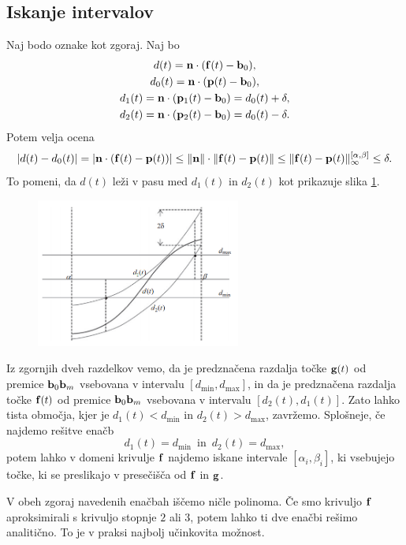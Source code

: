 

\subsection{Iskanje intervalov}
 Naj bodo oznake kot zgoraj. Naj bo
\begin{gather*}
d(t) = {\bf n}\cdot({\bf f}(t) - {\bf b}_0),\\
d_0(t)= {\bf n}\cdot ({\bf p}(t) - {\bf b}_0),\\
d_1(t) = {\bf n}\cdot ({\bf p}_1(t) - {\bf b}_0) = d_0(t) + \delta, \\
d_2(t) = {\bf n}\cdot ({\bf p}_2(t) - {\bf b}_0) = d_0(t) - \delta.
\end{gather*}
Potem velja ocena
$$
|d(t)-d_0(t)|=|{\bf n}\cdot({\bf f}(t)-{\bf p}(t))|\leq \lVert {\bf n}\rVert\cdot \lVert {\bf f}(t) - {\bf p}(t) \rVert \leq \lVert {\bf f}(t) - {\bf p}(t) \rVert _{\infty}^{[\alpha,\beta]} \leq \delta.
$$
To pomeni, da $d(t)$ leži v pasu med $d_1(t)$ in $d_2(t)$ kot prikazuje slika \ref{slika4}.
\begin{figure}[!h]
    \centering 
    \includegraphics[width=0.6\textwidth]{dist}
    \caption{}
  	\label{slika4}
\end{figure}

Iz zgornjih dveh razdelkov vemo, da je predznačena razdalja točke ${\bf g}(t)$ od premice ${\bf b}_0{\bf b}_m$ vsebovana v intervalu $[d_{\text{min}}, d_{\text{max}}]$, in da je predznačena razdalja točke ${\bf f}(t)$ od premice ${\bf b}_0{\bf b}_m$ vsebovana v intervalu $[d_2(t), d_1(t)]$. Zato lahko tista območja, kjer je $d_1(t) < d_{\text{min}}$ in $d_2(t) > d_{\text{max}}$, zavržemo. Splošneje, če najdemo rešitve enačb
$$
d_1(t) = d_{\text{min}} \, \text{ in } \, d_2(t) = d_{\text{max}},
$$
potem lahko v domeni krivulje ${\bf f}$ najdemo iskane intervale $[\alpha _i, \beta _i]$, ki vsebujejo točke, ki se preslikajo v presečišča od ${\bf f}$ in ${\bf g}$.

V obeh zgoraj navedenih enačbah iščemo ničle polinoma. Če smo krivuljo ${\bf f}$ aproksimirali s krivuljo stopnje $2$ ali $3$, potem lahko ti dve enačbi rešimo analitično. To je v praksi najbolj učinkovita možnost.